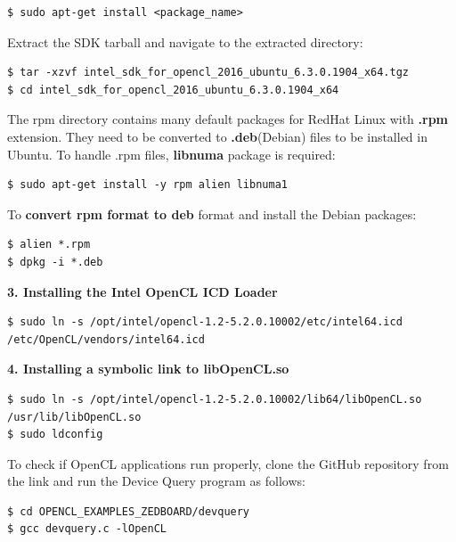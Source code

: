 \begin{scriptsize}
\linuxbash
\begin{lstlisting}
$ sudo apt-get install <package_name>
\end{lstlisting}
\end{scriptsize}
Extract the SDK tarball and navigate to the extracted directory:
\begin{scriptsize}
\linuxbash
\begin{lstlisting} 
$ tar -xzvf intel_sdk_for_opencl_2016_ubuntu_6.3.0.1904_x64.tgz
$ cd intel_sdk_for_opencl_2016_ubuntu_6.3.0.1904_x64
\end{lstlisting}
\end{scriptsize}
The rpm directory contains many default packages for RedHat Linux with \textbf{.rpm} extension. They need to be converted to \textbf{.deb}(Debian) files to be installed in Ubuntu. To handle .rpm files, \textbf{libnuma} package is required:
\begin{scriptsize}
\linuxbash
\begin{lstlisting} 
$ sudo apt-get install -y rpm alien libnuma1
\end{lstlisting}
\end{scriptsize}
To \textbf{convert rpm format to deb} format and install the Debian packages: 
\begin{scriptsize}
\linuxbash
\begin{lstlisting}        
$ alien *.rpm
$ dpkg -i *.deb 
\end{lstlisting}
\end{scriptsize}
\textbf{3. Installing the Intel OpenCL ICD Loader}
\begin{scriptsize}
\linuxbash
\begin{lstlisting}
$ sudo ln -s /opt/intel/opencl-1.2-5.2.0.10002/etc/intel64.icd /etc/OpenCL/vendors/intel64.icd
\end{lstlisting}
\end{scriptsize}
\textbf{4. Installing a symbolic link to libOpenCL.so} 
\begin{scriptsize}
\linuxbash
\begin{lstlisting}
$ sudo ln -s /opt/intel/opencl-1.2-5.2.0.10002/lib64/libOpenCL.so /usr/lib/libOpenCL.so 
$ sudo ldconfig
\end{lstlisting}
\end{scriptsize}
To check if OpenCL applications run properly, clone the GitHub repository from the link \cite{devquery} and run the Device Query program as follows:   
\begin{scriptsize}
\linuxbash
\begin{lstlisting}
$ cd OPENCL_EXAMPLES_ZEDBOARD/devquery 
$ gcc devquery.c -lOpenCL
\end{lstlisting}
\end{scriptsize}
